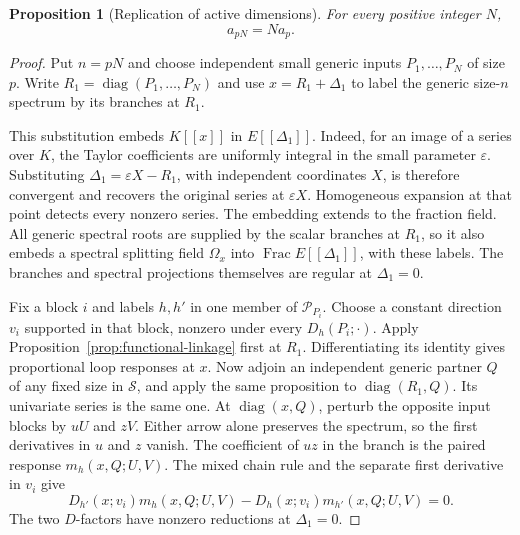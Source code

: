 \documentclass[11pt]{article}
\newtheorem{proposition}[theorem]{Proposition}
\theoremstyle{definition}
\theoremstyle{remark}
\numberwithin{equation}{section}
\begin{document}
\begin{proposition}[Replication of active dimensions]
\label{prop:active-replication}
For every positive integer $N$,
\[
 a_{pN}=N a_p.
\]
\end{proposition}

\begin{proof}
Put $n=pN$ and choose independent small generic inputs
$P_1,\ldots,P_N$ of size $p$.  Write
$R_1=\operatorname{diag}(P_1,\ldots,P_N)$ and use
$x=R_1+\Delta_1$ to label the generic size-$n$ spectrum by its branches
at $R_1$.

This substitution embeds $K[[x]]$ in $E[[\Delta_1]]$.  Indeed, for
an image of a series over $K$, the Taylor coefficients are uniformly
integral in the small parameter $\varepsilon$.  Substituting
$\Delta_1=\varepsilon X-R_1$, with independent coordinates $X$,
is therefore convergent and recovers the original series at
$\varepsilon X$.  Homogeneous expansion at that point detects every
nonzero series.  The embedding extends to the fraction field.  All
generic spectral roots are supplied by the scalar branches at $R_1$,
so it also embeds a spectral splitting field $\Omega_x$ into
$\operatorname{Frac}E[[\Delta_1]]$, with these labels.  The branches
and spectral projections themselves are regular at $\Delta_1=0$.

Fix a block $i$ and labels $h,h'$ in one member of
$\mathcal P_{P_i}$.  Choose a constant direction $v_i$ supported in
that block, nonzero under every $D_h(P_i;\cdot)$.  Apply
Proposition~\ref{prop:functional-linkage} first at $R_1$.
Differentiating its identity gives proportional loop responses at
$x$.  Now adjoin an independent generic partner $Q$ of any fixed
size in $\mathcal S$, and apply the same proposition to
$\operatorname{diag}(R_1,Q)$.  Its univariate series is the same
one.  At $\operatorname{diag}(x,Q)$, perturb the opposite input
blocks by $uU$ and $zV$.  Either arrow alone preserves the spectrum,
so the first derivatives in $u$ and $z$ vanish.  The coefficient of
$uz$ in the branch is the paired response $m_h(x,Q;U,V)$.
The mixed chain rule and the separate first derivative in $v_i$
give
\begin{equation}
 D_{h'}(x;v_i)m_h(x,Q;U,V)
   -D_h(x;v_i)m_{h'}(x,Q;U,V)=0.
 \label{eq:replicated-pair-relation}
\end{equation}
The two $D$-factors have nonzero reductions at $\Delta_1=0$.


\end{proof}
\end{document}
